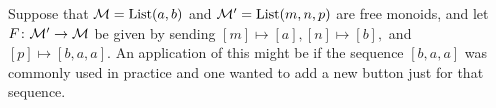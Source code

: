 \documentclass[../main/CT4S-EN-RU]{subfiles}
\begin{document}
\begin{exerciseRUS}
\end{exerciseRUS}


\subsubsection{}

\begin{exampleENG}[Whiskering]\label{ex:whiskering}
Suppose that $\mathcal{M}=\operatorname{List}(a,b)$ and $\mathcal{M}'=\operatorname{List}(m,n,p)$ are free monoids, and let $F\colon\mathcal{M}'\rightarrow\mathcal{M}$ be given by sending $[m]\mapsto[a], [n]\mapsto[b],$ and $[p]\mapsto[b,a,a].$ An application of this might be if the sequence $[b,a,a]$ was commonly used in practice and one wanted to add a new button just for that sequence.


\end{exampleENG}
\end{document}
